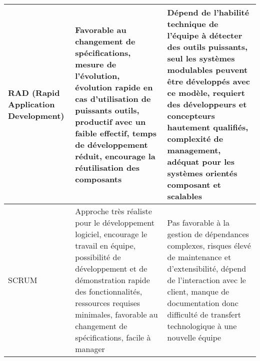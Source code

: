 \begin{center}
\begin{longtable}{|p{}|p{}|p{}|}
		\hline
		RAD (Rapid Application Development) &  
		Favorable au changement de spécifications, mesure de l’évolution, évolution rapide en cas d’utilisation de puissants outils, productif avec un faible effectif, temps de développement réduit, encourage la réutilisation des composants &
		Dépend de l’habilité technique de l’équipe à détecter des outils puissants, seul les systèmes modulables peuvent être développés avec ce modèle, requiert des développeurs et concepteurs hautement qualifiés, complexité de management, adéquat pour les systèmes orientés composant et scalables
		\\
		
		\hline
		SCRUM &  
		Approche très réaliste pour le développement logiciel, encourage le travail en équipe, possibilité de développement et de démonstration rapide des fonctionnalités, ressources requises minimales, favorable au changement de spécifications, facile à manager &
		Pas favorable à la gestion de dépendances complexes, risques élevé de maintenance et d’extensibilité, dépend de l’interaction avec le client, manque de documentation donc difficulté de transfert  technologique  à  une nouvelle équipe
		\\
		
		\hline 
	\end{longtable} 
\end{center}